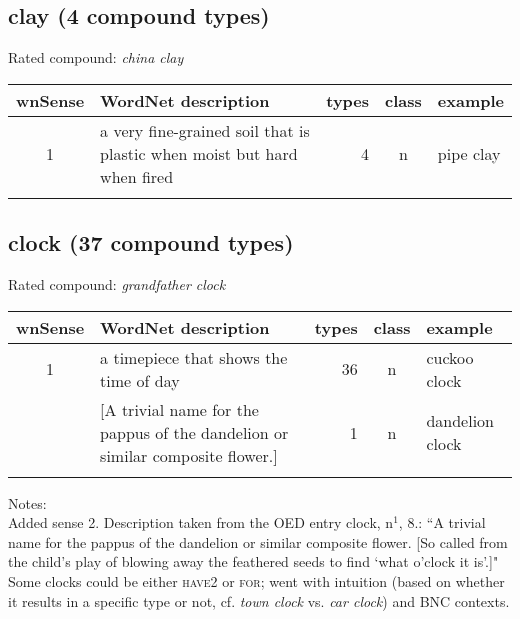 \subsection{clay      (4 compound types)}
Rated compound: \emph{china clay}

\vspace*{1ex}

\noindent
\begin{longtable}{c>{\raggedright\arraybackslash}p{5cm}rc>{\raggedright\arraybackslash}p{2cm}}\lsptoprule
{\small wnSense}&WordNet description&types&class&example\\\midrule
1&a very fine-grained soil that is plastic when moist but hard when fired&4&n&pipe clay\\\lspbottomrule
\end{longtable}

\subsection{clock    (37 compound types)}
Rated compound: \emph{grandfather clock}

\vspace*{1ex}

\noindent
\begin{longtable}{c>{\raggedright\arraybackslash}p{5cm}rc>{\raggedright\arraybackslash}p{2cm}}\lsptoprule
{\small wnSense}&WordNet description&types&class&example\\\midrule
1&a timepiece that shows the time of day&36&n&cuckoo clock\\\tablevspace
2&{}[A trivial name for the pappus of the dandelion or similar composite flower.]&1&n&dandelion clock\\\lspbottomrule
\end{longtable}

\noindent
Notes:\\
Added sense 2. Description taken from the OED entry clock, n$^1$, 8.: ``A trivial name for the pappus of the dandelion or similar composite flower.  [So called from the child's play of blowing away the feathered seeds to find ‘what o'clock it is’.]" Some clocks could be either \textsc{have2} or \textsc{for}; went with intuition (based on whether it results in a specific type or not, cf. \emph{town clock} vs. \emph{car clock}) and BNC contexts.

